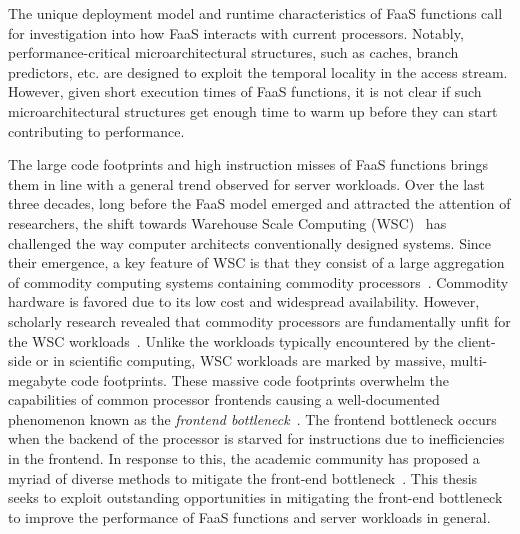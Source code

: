 \documentclass[../main.tex]{subfiles}
\begin{document}
\begin{refsection}
The unique deployment model and runtime characteristics of FaaS
functions call for investigation into how FaaS interacts with current
processors. Notably, performance-critical microarchitectural structures,
such as caches, branch predictors, etc. 
are designed to exploit the temporal locality in the access stream. 
However, given short execution times of FaaS functions, it is not clear if such 
microarchitectural structures get enough time to warm up before they can start 
contributing to performance. 

The large code footprints and high instruction misses of FaaS
functions brings them in line with a general trend observed for server
workloads. Over the last three decades, long before the FaaS model
emerged and attracted the attention of researchers, the shift towards
Warehouse Scale Computing (WSC)~\cite{barroso18_datac_as_comput} has
challenged the way computer architects conventionally designed
systems. Since their emergence, a key feature of WSC is that they
consist of a large aggregation of commodity computing systems
containing commodity
processors~\cite{barroso03_web_searc_planet}. Commodity hardware is
favored due to its low cost and widespread availability. However,
scholarly research revealed that commodity processors are
fundamentally unfit for the WSC
workloads~\cite{ferdman12_clear_cloud,kanev15_profil}. Unlike the
workloads typically encountered by the client-side or in scientific
computing, WSC workloads are marked by massive, multi-megabyte code
footprints. These massive code footprints overwhelm the capabilities
of common processor frontends causing a well-documented phenomenon
known as the \emph{frontend
  bottleneck}~\cite{ailamaki99_dbmss_moder_proces,keeton98_perfor_charac_quad_pentium_pro,ranganathan98_perfor_datab_workl_shared_memor}. The
frontend bottleneck occurs when the backend of the processor is
starved for instructions due to inefficiencies in the frontend. In
response to this, the academic community has proposed a myriad of
diverse methods to mitigate the front-end
bottleneck~\cite{reinman99_fetch_direc_instr_prefet,kumar17_boomer,kumar18_blast_throug_front_end_bottl_with_shotg,kumar20_shoot_down_server_front_end_bottl,ferdman08_tempor,ferdman11_proac_instr_fetch,kaynak13_shift,kaynak15_confl,ayers19_asmdb,ajorpaz18_explor_predic_replac_polic_instr,khan20_i_spy,soundararajan21_pdede,ansari20_divid,khan21_rippl,spracklen05_effec_instr_prefet_chip_multip}.
This thesis seeks to exploit outstanding opportunities in mitigating
the front-end bottleneck to improve the performance of FaaS
functions and server workloads in general.


\end{refsection}
\end{document}
